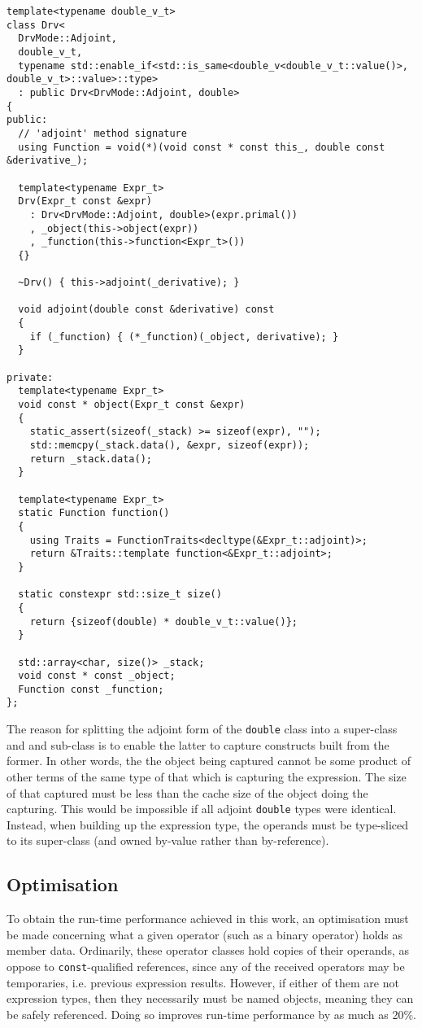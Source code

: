\documentclass[a4paper,10pt]{article}
\begin{document}
\begin{lstlisting}[caption={Capturing an expression for deferred evaluation}, label=lst:capture]
template<typename double_v_t>
class Drv<
  DrvMode::Adjoint,
  double_v_t,
  typename std::enable_if<std::is_same<double_v<double_v_t::value()>, double_v_t>::value>::type>
  : public Drv<DrvMode::Adjoint, double>
{
public:
  // 'adjoint' method signature
  using Function = void(*)(void const * const this_, double const &derivative_);

  template<typename Expr_t>
  Drv(Expr_t const &expr)
    : Drv<DrvMode::Adjoint, double>(expr.primal())
    , _object(this->object(expr))
    , _function(this->function<Expr_t>())
  {}

  ~Drv() { this->adjoint(_derivative); }

  void adjoint(double const &derivative) const
  {
    if (_function) { (*_function)(_object, derivative); }
  }

private:
  template<typename Expr_t>
  void const * object(Expr_t const &expr)
  {
    static_assert(sizeof(_stack) >= sizeof(expr), "");
    std::memcpy(_stack.data(), &expr, sizeof(expr));
    return _stack.data();
  }

  template<typename Expr_t>
  static Function function()
  {
    using Traits = FunctionTraits<decltype(&Expr_t::adjoint)>;
    return &Traits::template function<&Expr_t::adjoint>;
  }

  static constexpr std::size_t size()
  {
    return {sizeof(double) * double_v_t::value()};
  }

  std::array<char, size()> _stack;
  void const * const _object;
  Function const _function;
};
\end{lstlisting}

The reason for splitting the adjoint form of the \texttt{double} class into a super-class and and sub-class is to enable the latter to capture constructs built from the former. In other words, the the object being captured cannot be some product of other terms of the same type of that which is capturing the expression. The size of that captured must be less than the cache size of the object doing the capturing. This would be impossible if all adjoint \texttt{double} types were identical. Instead, when building up the expression type, the operands must be type-sliced to its super-class (and owned by-value rather than by-reference).

\subsection{Optimisation}
To obtain the run-time performance achieved in this work, an optimisation must be made concerning what a given operator (such as a binary operator) holds as member data. Ordinarily, these operator classes hold copies of their operands, as oppose to \texttt{const}-qualified references, since any of the received operators may be temporaries, i.e. previous expression results. However, if either of them are not expression types, then they necessarily must be named objects, meaning they can be safely referenced. Doing so improves run-time performance by as much as 20\%.
\end{document}
